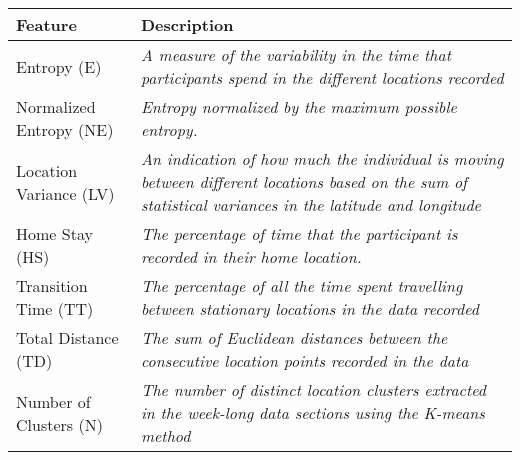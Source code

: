 \begin{table}[]
    \centering
\begin{tabular}{|p{}|p{}|}
\hline
\textbf{Feature}                                 & \textbf{Description}                                                                                                                                                                                                      \\ \hline
Entropy (E)                                      & \textit{A measure of the variability in the time that participants spend in the different locations recorded}                                                                                                             \\ \hline
Normalized Entropy (NE)                          & \textit{Entropy normalized by the maximum possible entropy.}                                                                                                                                                              \\ \hline
Location Variance (LV)                           & \textit{An indication of how much the individual is moving between different locations based on the sum of statistical variances in the latitude and longitude}                                                           \\ \hline
Home Stay (HS)                                   & \textit{The percentage of time that the participant is recorded in their home location.}                                                                                                                                  \\ \hline
Transition Time (TT)                             & \textit{The percentage of all the time spent travelling between stationary locations in the data recorded}                                                                                                                \\ \hline
Total Distance (TD)                              & \textit{The sum of Euclidean distances between the consecutive location points recorded in the data}                                                                                                                      \\ \hline
Number of Clusters (N)                           & \textit{The number of distinct location clusters extracted in the week-long data sections using the K-means method}                                                                                                       \\ \hline

\end{tabular}
\end{table}
